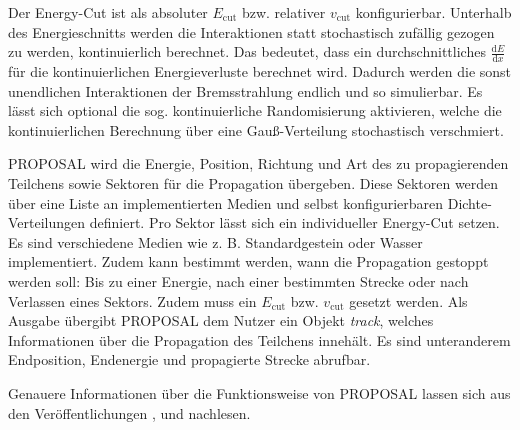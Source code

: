 Der Energy-Cut ist als absoluter $E_\mathrm{cut}$ bzw. relativer $v_\mathrm{cut}$ konfigurierbar.
Unterhalb des Energieschnitts werden die Interaktionen statt stochastisch zufällig gezogen zu werden,
kontinuierlich berechnet.
Das bedeutet, dass ein durchschnittliches $\frac{\mathrm{d}E}{\mathrm{d}x}$
für die kontinuierlichen Energieverluste berechnet wird. 
Dadurch werden die sonst unendlichen Interaktionen der Bremsstrahlung endlich und so simulierbar.
Es lässt sich optional die sog. kontinuierliche Randomisierung
aktivieren, welche die kontinuierlichen Berechnung über eine Gauß-Verteilung stochastisch verschmiert.

PROPOSAL wird die Energie, Position, Richtung und Art des zu propagierenden Teilchens 
sowie Sektoren für die Propagation übergeben.
Diese Sektoren werden über eine Liste an implementierten Medien 
und selbst konfigurierbaren Dichte-Verteilungen definiert.
Pro Sektor lässt sich ein individueller Energy-Cut setzen.
Es sind verschiedene Medien wie z. B. Standardgestein oder Wasser implementiert. 
Zudem kann bestimmt werden, wann die Propagation gestoppt werden soll: 
Bis zu einer Energie, nach einer bestimmten Strecke oder 
nach Verlassen eines Sektors.
Zudem muss ein $E_\mathrm{cut}$ bzw. $v_\mathrm{cut}$ gesetzt werden. 
Als Ausgabe übergibt PROPOSAL dem Nutzer ein Objekt \textit{track}, welches 
Informationen über die Propagation des Teilchens innehält.
Es sind unteranderem Endposition, Endenergie und propagierte Strecke abrufbar.  


Genauere Informationen über die Funktionsweise von PROPOSAL lassen sich
aus den Veröffentlichungen \cite{proposal}, \cite{proposal2} und \cite{proposal3} nachlesen.
    


